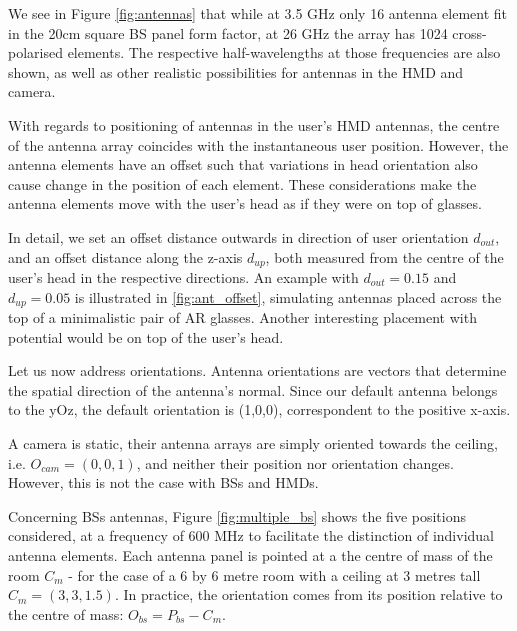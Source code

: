 
We see in Figure \ref{fig:antennas} that while at 3.5 GHz only 16 antenna element fit in the 20cm square \ac{BS} panel form factor, at 26 GHz the array has 1024 cross-polarised elements. The respective half-wavelengths at those frequencies are also shown, as well as other realistic possibilities for antennas in the \ac{HMD} and camera.

With regards to positioning of antennas in the user's \ac{HMD} antennas, the centre of the antenna array coincides with the instantaneous user position. However, the antenna elements have an offset such that variations in head orientation also cause change in the position of each element. These considerations make the antenna elements move with the user's head as if they were on top of glasses.

In detail, we set an offset distance outwards in direction of user orientation $d_{out}$, and an offset distance along the z-axis $d_{up}$, both measured from the centre of the user's head in the respective directions. An example with $d_{out} = 0.15$ and $d_{up} = 0.05$ is illustrated in \ref{fig:ant_offset}, simulating antennas placed across the top of a minimalistic pair of \ac{AR} glasses. Another interesting placement with potential would be on top of the user's head.


Let us now address orientations. Antenna orientations are vectors that determine the spatial direction of the antenna's normal. Since our default antenna belongs to the yOz, the default orientation is (1,0,0), correspondent to the positive x-axis. 

A camera is static, their antenna arrays are simply oriented towards the ceiling, i.e. $O_{cam} = (0,0,1)$, and neither their position nor orientation changes. However, this is not the case with \acp{BS} and \acp{HMD}. 

Concerning \acsp{BS} antennas, Figure \ref{fig:multiple_bs} shows the five positions considered, at a frequency of 600 MHz to facilitate the distinction of individual antenna elements. Each antenna panel is pointed at a the centre of mass of the room $C_m$ - for the case of a 6 by 6 metre room with a ceiling at 3 metres tall $C_m = (3, 3, 1.5)$. In practice, the orientation comes from its position relative to the centre of mass: $O_{bs} = P_{bs} - C_m$.

